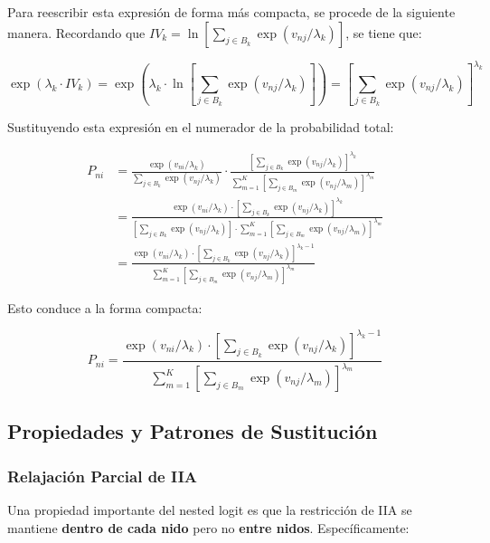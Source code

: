 \documentclass[
]{book}
\begin{document}
Para reescribir esta expresión de forma más compacta, se procede de la siguiente manera. Recordando que \(IV_k = \ln\left[\sum_{j \in B_k} \exp(v_{nj}/\lambda_k)\right]\), se tiene que:

\[\exp(\lambda_k \cdot IV_k) = \exp\left(\lambda_k \cdot \ln\left[\sum_{j \in B_k} \exp(v_{nj}/\lambda_k)\right]\right) = \left[\sum_{j \in B_k} \exp(v_{nj}/\lambda_k)\right]^{\lambda_k}\]

Sustituyendo esta expresión en el numerador de la probabilidad total:

\[
\begin{aligned}
P_{ni} &= \frac{\exp(v_{ni}/\lambda_k)}{\sum_{j \in B_k} \exp(v_{nj}/\lambda_k)} \cdot \frac{\left[\sum_{j \in B_k} \exp(v_{nj}/\lambda_k)\right]^{\lambda_k}}{\sum_{m=1}^K \left[\sum_{j \in B_m} \exp(v_{nj}/\lambda_m)\right]^{\lambda_m}}\\
&= \frac{\exp(v_{ni}/\lambda_k) \cdot \left[\sum_{j \in B_k} \exp(v_{nj}/\lambda_k)\right]^{\lambda_k}}{\left[\sum_{j \in B_k} \exp(v_{nj}/\lambda_k)\right] \cdot \sum_{m=1}^K \left[\sum_{j \in B_m} \exp(v_{nj}/\lambda_m)\right]^{\lambda_m}}\\
&= \frac{\exp(v_{ni}/\lambda_k) \cdot \left[\sum_{j \in B_k} \exp(v_{nj}/\lambda_k)\right]^{\lambda_k - 1}}{\sum_{m=1}^K \left[\sum_{j \in B_m} \exp(v_{nj}/\lambda_m)\right]^{\lambda_m}}
\end{aligned}
\]

Esto conduce a la forma compacta:

\begin{equation}
P_{ni} = \frac{\exp(v_{ni}/\lambda_k) \cdot [\sum_{j \in B_k} \exp(v_{nj}/\lambda_k)]^{\lambda_k - 1}}{\sum_{m=1}^K [\sum_{j \in B_m} \exp(v_{nj}/\lambda_m)]^{\lambda_m}}
\label{eq:totalprobcompact}
\end{equation}

\subsection{Propiedades y Patrones de Sustitución}\label{propiedades-y-patrones-de-sustituciuxf3n}

\subsubsection{Relajación Parcial de IIA}\label{relajaciuxf3n-parcial-de-iia}

Una propiedad importante del nested logit es que la restricción de IIA se mantiene \textbf{dentro de cada nido} pero no \textbf{entre nidos}. Específicamente:
\end{document}
